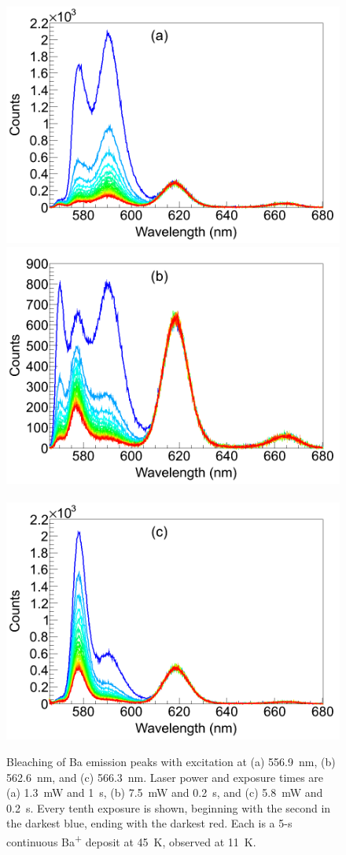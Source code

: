 \begin{figure} %
        \centering
                \includegraphics[width=.5\textwidth]{figures/bleach_spectra_a.png}
                \includegraphics[width=.5\textwidth]{figures/bleach_spectra_b.png}
                ~
                \includegraphics[width=.5\textwidth]{figures/bleach_spectra_c.png}
                \caption{Bleaching of Ba emission peaks with excitation at (a) 556.9~nm, (b) 562.6~nm, and (c) 566.3~nm.  Laser power and exposure times are (a) 1.3~mW and 1~s, (b) 7.5~mW and 0.2~s, and (c) 5.8~mW and 0.2~s.  Every tenth exposure is shown, beginning with the second in the darkest blue, ending with the darkest red.  Each is a 5-s continuous Ba\textsuperscript{+} deposit at 45~K, observed at 11~K. \cite{Mong2015}}
\label{fig:specBleach}
\end{figure}



